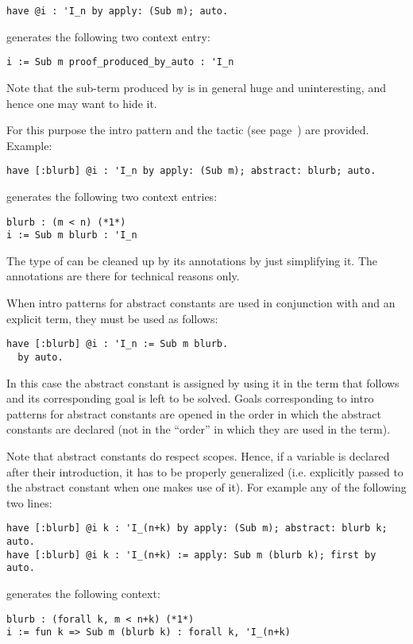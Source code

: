 \begin{lstlisting}
have @i : 'I_n by apply: (Sub m); auto.
\end{lstlisting}
generates the following two context entry:
\begin{lstlisting}
i := Sub m proof_produced_by_auto : 'I_n
\end{lstlisting}

Note that the sub-term produced by  is in general huge and
uninteresting, and hence one may want to hide it.

For this purpose the \C{[: name ]} intro pattern and the tactic
 (see page~\pageref{ssec:abstract}) are provided.
Example:
\begin{lstlisting}
have [:blurb] @i : 'I_n by apply: (Sub m); abstract: blurb; auto.
\end{lstlisting}
generates the following two context entries:
\begin{lstlisting}
blurb : (m < n) (*1*)
i := Sub m blurb : 'I_n
\end{lstlisting}
The type of  can be cleaned up by its annotations by just simplifying
it.  The annotations are there for technical reasons only.

When intro patterns for abstract constants are used in conjunction
with  and an explicit term, they must be used as follows:

\begin{lstlisting}
have [:blurb] @i : 'I_n := Sub m blurb.
  by auto.
\end{lstlisting}

In this case the abstract constant  is assigned by using it
in the term that follows \C{:=} and its corresponding goal is left to
be solved.  Goals corresponding to intro patterns for abstract constants
are opened in the order in which the abstract constants are declared (not
in the ``order'' in which they are used in the term).

Note that abstract constants do respect scopes.  Hence, if a variable
is declared after their introduction, it has to be properly generalized (i.e.
explicitly passed to the abstract constant when one makes use of it).
For example any of the following two lines:
\begin{lstlisting}
have [:blurb] @i k : 'I_(n+k) by apply: (Sub m); abstract: blurb k; auto.
have [:blurb] @i k : 'I_(n+k) := apply: Sub m (blurb k); first by auto.
\end{lstlisting}
generates the following context:
\begin{lstlisting}
blurb : (forall k, m < n+k) (*1*)
i := fun k => Sub m (blurb k) : forall k, 'I_(n+k)
\end{lstlisting}

